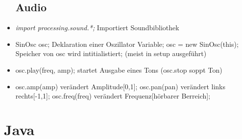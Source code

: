 \documentclass[12pt,landscape]{article}
\begin{document}
\begin{multicols}{3}
\begin{itemize}
\subsection{Audio}
\item \textit{import processing.sound.*;} Importiert Soundbibliothek 
\item SinOsc osc; Deklaration einer Oszillator Variable; osc = new SinOsc(this); Speicher von osc wird intitialistiert; (meist in setup ausgeführt)
\item osc.play(freq, amp); startet Ausgabe eines Tons (osc.stop soppt Ton)
\item osc.amp(amp) verändert Amplitude[0,1]; osc.pan(pan) verändert links rechts[-1,1]; osc.freq(freq) verändert Frequenz[hörbarer Berreich];
\end{itemize}


\section{Java}

\end{multicols}
\end{document}
